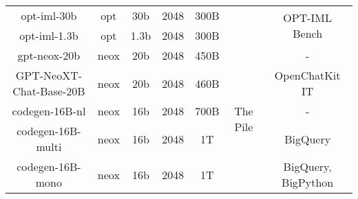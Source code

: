 \begin{table}[]
\begin{adjustbox}{max width=\textwidth}
\begin{tabular}{ccccccc}
opt-iml-30b                                             & opt                                 & 30b                               & 2048                                & 300B                                   &                                                                                                                           &                                  \multirow{2}{*}{OPT-IML Bench}                  \\
opt-iml-1.3b                                            & opt                                 & 1.3b                              & 2048                                & 300B                                   &                                                                                                                           &                                                    \\
\cmidrule(lr){1-7}
gpt-neox-20b                                            & neox                                & 20b                               & 2048                                & 450B                                   & \multirow{8}{*}{The Pile}                                                                                                 & -                                                  \\
GPT-NeoXT-Chat-Base-20B                             & neox                                & 20b                               & 2048                                &   460B                                     &                                                                                                                           & OpenChatKit IT          \\
codegen-16B-nl                                      & neox                                & 16b                               & 2048                                & 700B                                   &                                                                                                                           & -                                                  \\
codegen-16B-multi                                   & neox                                & 16b                               & 2048                                & 1T                                     &                                                                                                                           & BigQuery                                           \\
codegen-16B-mono                                    & neox                                & 16b                               & 2048                                & 1T                                     &                                                                                                                           & BigQuery, BigPython                               \\

\end{tabular}
\end{adjustbox}
\end{table}
